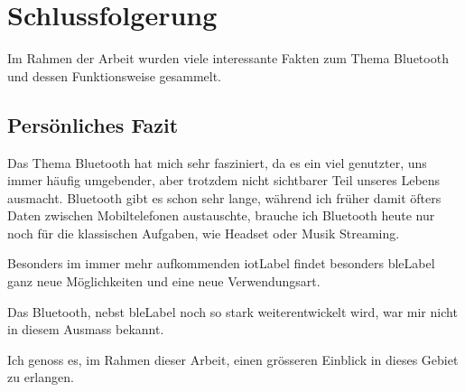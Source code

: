 \chapter{Schlussfolgerung}

Im Rahmen der Arbeit wurden viele interessante Fakten zum Thema Bluetooth und dessen Funktionsweise gesammelt.



\section{Persönliches Fazit}
Das Thema Bluetooth hat mich sehr fasziniert, da es ein viel genutzter, uns immer häufig umgebender, aber trotzdem nicht sichtbarer Teil unseres Lebens ausmacht.
Bluetooth gibt es schon sehr lange, während ich früher damit öfters Daten zwischen Mobiltelefonen austauschte, brauche ich Bluetooth heute nur noch für die klassischen Aufgaben, wie Headset oder Musik Streaming.

Besonders im immer mehr aufkommenden \gls{iotLabel} findet besonders \gls{bleLabel} ganz neue Möglichkeiten und eine neue Verwendungsart.

Das Bluetooth, nebst \gls{bleLabel} noch so stark weiterentwickelt wird, war mir nicht in diesem Ausmass bekannt.

Ich genoss es, im Rahmen dieser Arbeit, einen grösseren Einblick in dieses Gebiet zu erlangen.
